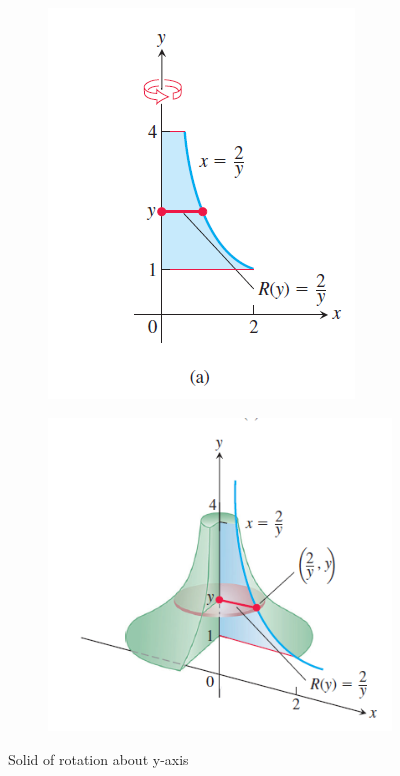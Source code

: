 \documentclass[12pt]{article}
\begin{document}
\begin{figure}[H]
    \centering
    \begin{subfigure}[b]{0.3\linewidth} 
         \includegraphics[width = 1\linewidth]{Images/solid of rev 3.png}
    \end{subfigure}
    \begin{subfigure}[b]{0.4\linewidth} 
       \includegraphics[width = 1\linewidth]{Images/solid of rev 4.png}
  \end{subfigure}
  \caption{Solid of rotation about y-axis}
\end{figure}
\end{document}
